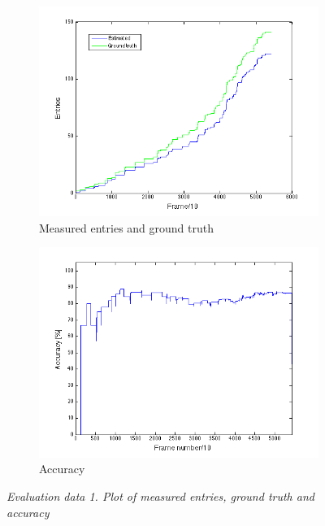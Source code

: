 \begin{figure}[H]
\centering
\begin{subfigure}{.5\textwidth}
  \centering
  \includegraphics[width=.8\linewidth]{images/EntriesEval.png}
  \caption{Measured entries and ground truth}
  \label{fig:sub1}
\end{subfigure}%
\begin{subfigure}{.5\textwidth}
  \centering
  \includegraphics[width=.8\linewidth]{images/AccEntriesEval.png}
  \caption{Accuracy}
  \label{fig:sub2}
\end{subfigure}
\caption[Entries evaluation]{\textit{Evaluation data 1. Plot of measured entries, ground truth and accuracy}}
\label{fig:Entries evaluation}
\end{figure}

